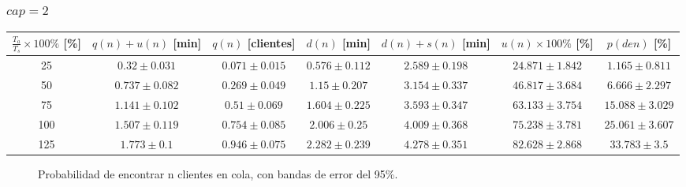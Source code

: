 \subsubsection[cap = 2]{$cap = 2$}

\begin{small}
  \begin{tabular}{||c||c|c|c|c|c|c||}
    \hline \hline
    $\frac{T_a}{T_s}\times100\%$ [\%] & $q(n)+u(n)$ [min] & $q(n)$ [clientes] & $d(n)$ [min] & $d(n)+s(n)$ [min] & $u(n)\times100\%$ [\%] & $p(den)$ [\%] \\
    \hline \hline
    25 & $0.32 \pm 0.031$ & $0.071 \pm 0.015$ & $0.576 \pm 0.112$ & $2.589 \pm 0.198$ & $24.871 \pm 1.842$ & $1.165 \pm 0.811$ \\
    \hline
    50 & $0.737 \pm 0.082$ & $0.269 \pm 0.049$ & $1.15 \pm 0.207$ & $3.154 \pm 0.337$ & $46.817 \pm 3.684$ & $6.666 \pm 2.297$ \\
    \hline
    75 & $1.141 \pm 0.102$ & $0.51 \pm 0.069$ & $1.604 \pm 0.225$ & $3.593 \pm 0.347$ & $63.133 \pm 3.754$ & $15.088 \pm 3.029$ \\
    \hline
    100 & $1.507 \pm 0.119$ & $0.754 \pm 0.085$ & $2.006 \pm 0.25$ & $4.009 \pm 0.368$ & $75.238 \pm 3.781$ & $25.061 \pm 3.607$ \\
    \hline
    125 & $1.773 \pm 0.1$ & $0.946 \pm 0.075$ & $2.282 \pm 0.239$ & $4.278 \pm 0.351$ & $82.628 \pm 2.868$ & $33.783 \pm 3.5$ \\
    \hline \hline
  \end{tabular}
\end{small}

\begin{figure}[H]
  \centering
  \begin{subfigure}{0.267\linewidth}
  \end{subfigure}\hspace{0.35cm}
  \begin{subfigure}{0.267\linewidth}
  \end{subfigure}\hspace{0.35cm}
  \begin{subfigure}{0.267\linewidth}
  \end{subfigure}
  \begin{subfigure}{0.267\linewidth}
  \end{subfigure}\hspace{0.35cm}
  \begin{subfigure}{0.267\linewidth}
  \end{subfigure}
  \caption{Probabilidad de encontrar n clientes en cola, con bandas de error del 95\%.}
\end{figure}

